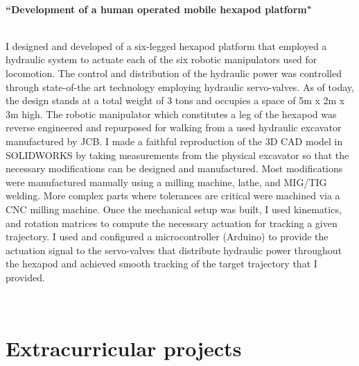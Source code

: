 \documentclass[10pt]{article} %
\begin{document}
~~~

\medskip %

{\raggedright\textbf{``Development of a human operated mobile hexapod platform"}}\\
I designed and developed of a six-legged hexapod platform that employed a hydraulic system to actuate each of the six robotic manipulators used for locomotion. The control and distribution of the hydraulic power was controlled through state-of-the art technology employing hydraulic servo-valves. As of today, the design stands at a total weight of 3 tons and occupies a space of 5m x 2m x 3m high. The robotic manipulator which constitutes a leg of the hexapod was reverse engineered and repurposed for walking from a used hydraulic excavator manufactured by JCB. I made a faithful reproduction of the 3D CAD model in SOLIDWORKS by taking measurements from the physical excavator so that the necessary modifications can be designed and manufactured. Most modifications were manufactured manually using a milling machine, lathe, and MIG/TIG welding. More complex parts where tolerances are critical were machined via a CNC milling machine. Once the mechanical setup was built, I used kinematics, and rotation matrices to compute the necessary actuation for tracking a given trajectory. I used and configured a microcontroller (Arduino) to provide the actuation signal to the servo-valves that distribute hydraulic power throughout the hexapod and achieved smooth tracking of the target trajectory that I provided.

~~~~~

\medskip %

\newpage
\section{Extracurricular projects}
\end{document}
